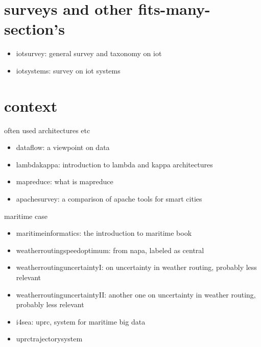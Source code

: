 \documentclass{article}
\begin{document}

\chapter{surveys and other fits-many-section's}

\begin{itemize}
    \item \cite{iotsurvey} iotsurvey: general survey and taxonomy on iot
    \item \cite{iotsystems} iotsystems: survey on iot systems
\end{itemize}

\chapter{context}

often used architectures etc

\begin{itemize}
    \item \cite{dataflow} dataflow: a viewpoint on data
    \item \cite{lambdakappa} lambdakappa: introduction to lambda and kappa architectures
    \item \cite{mapreduce} mapreduce: what is mapreduce
    \item \cite{apachesurvey} apachesurvey: a comparison of apache tools for smart cities
\end{itemize}

maritime case

\begin{itemize}
    \item \cite{maritimeinformatics} maritimeinformatics: the introduction to maritime book
    \item \cite{weatherroutingspeedoptimum} weatherroutingspeedoptimum: from napa, labeled as central
    \item \cite{weatherroutinguncertaintyI} weatherroutinguncertaintyI: on uncertainty in weather routing, probably less relevant
     \item \cite{weatherroutinguncertaintyII} weatherroutinguncertaintyII: another one on uncertainty in weather routing, probably less relevant
     \item \cite{i4sea} i4sea: uprc, system for maritime big data
     \item \cite{uprctrajectorysystem} uprctrajectorysystem
\end{itemize}
\end{document}

